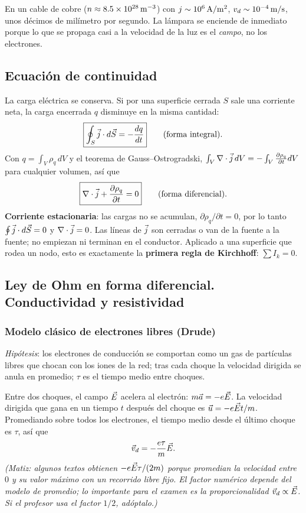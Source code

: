 \documentclass[11pt]{article}
\begin{document}
\begin{idea}
En un cable de cobre ($n\approx8.5\times10^{28}\,\mathrm{m^{-3}}$) con $j\sim10^6\,\mathrm{A/m^2}$, $v_d\sim10^{-4}\,\mathrm{m/s}$, unos décimos de milímetro por segundo. La lámpara se enciende de inmediato porque lo que se propaga casi a la velocidad de la luz es el \emph{campo}, no los electrones.
\end{idea}

\subsection{Ecuación de continuidad}
La carga eléctrica se conserva. Si por una superficie cerrada $S$ sale una corriente neta, la carga encerrada $q$ disminuye en la misma cantidad:
\[
\boxed{\oint_S \vec{j}\cdot d\vec S=-\frac{dq}{dt}}\qquad\text{(forma integral)}.
\]
Con $q=\int_V\rho_q\,dV$ y el teorema de Gauss--Ostrogradski, $\int_V\nabla\cdot\vec{j}\,dV=-\int_V\frac{\partial\rho_q}{\partial t}dV$ para cualquier volumen, así que
\[
\boxed{\nabla\cdot\vec{j}+\frac{\partial\rho_q}{\partial t}=0}\qquad\text{(forma diferencial)}.
\]
\textbf{Corriente estacionaria}: las cargas no se acumulan, $\partial\rho_q/\partial t=0$, por lo tanto $\oint\vec{j}\cdot d\vec S=0$ y $\nabla\cdot\vec{j}=0$. Las líneas de $\vec{j}$ son cerradas o van de la fuente a la fuente; no empiezan ni terminan en el conductor. Aplicado a una superficie que rodea un nodo, esto es exactamente la \textbf{primera regla de Kirchhoff}: $\sum I_k=0$.

\subsection{Ley de Ohm en forma diferencial. Conductividad y resistividad}
\subsubsection*{Modelo clásico de electrones libres (Drude)}
\emph{Hipótesis}: los electrones de conducción se comportan como un gas de partículas libres que chocan con los iones de la red; tras cada choque la velocidad dirigida se anula en promedio; $\tau$ es el tiempo medio entre choques.

Entre dos choques, el campo $\vec{E}$ acelera al electrón: $m\vec a=-e\vec{E}$. La velocidad dirigida que gana en un tiempo $t$ después del choque es $\vec u=-e\vec{E} t/m$. Promediando sobre todos los electrones, el tiempo medio desde el último choque es $\tau$, así que
\[
\vec v_d=-\frac{e\tau}{m}\vec{E}.
\]
\emph{(Matiz: algunos textos obtienen $-e\vec{E}\tau/(2m)$ porque promedian la velocidad entre $0$ y su valor máximo con un recorrido libre fijo. El factor numérico depende del modelo de promedio; lo importante para el examen es la proporcionalidad $\vec v_d\propto\vec{E}$. Si el profesor usa el factor $1/2$, adóptalo.)}
\end{document}

